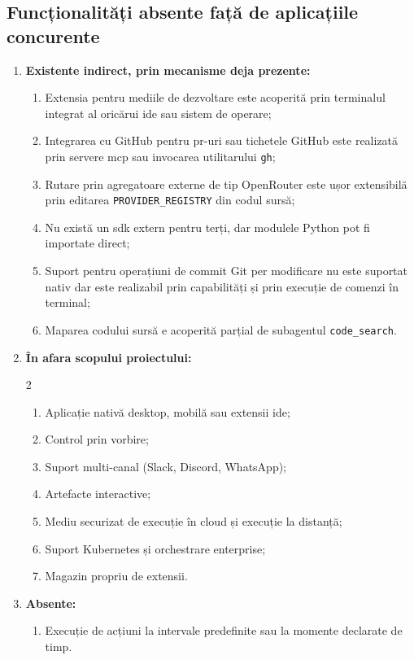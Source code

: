 \documentclass[12pt, a4paper, oneside, romanian]{teza-upb}
\begin{document}
    \subsection{Funcționalități absente față de aplicațiile concurente}

    \begin{enumerate}

      \item \textbf{Existente indirect, prin mecanisme deja prezente:}

      \begin{enumerate}
        \item Extensia pentru mediile de dezvoltare este acoperită prin terminalul integrat al oricărui \ac{ide} sau sistem de operare;
        \item Integrarea cu GitHub pentru \ac{pr}-uri sau tichetele GitHub este realizată prin servere \ac{mcp} sau invocarea utilitarului \texttt{gh};
        \item Rutare prin agregatoare externe de tip OpenRouter este ușor extensibilă prin editarea \texttt{PROVIDER\_REGISTRY} din codul sursă;
        \item Nu există un \ac{sdk} extern pentru terți, dar modulele Python pot fi importate direct;
        \item Suport pentru operațiuni de commit Git per modificare nu este suportat nativ dar este realizabil prin capabilități și prin execuție de comenzi în terminal;
        \item Maparea codului sursă e acoperită parțial de subagentul \texttt{code\_search}.
      \end{enumerate}

      \item \textbf{În afara scopului proiectului:}

      \begin{multicols}{2}
        \begin{enumerate}
          \item Aplicație nativă desktop, mobilă sau extensii \ac{ide};
          \item Control prin vorbire;
          \item Suport multi-canal (Slack, Discord, WhatsApp);
          \item Artefacte interactive;
          \item Mediu securizat de execuție în cloud și execuție la distanță;
          \item Suport Kubernetes și orchestrare enterprise;
          \item Magazin propriu de extensii.
        \end{enumerate}
      \end{multicols}

    \item \textbf{Absente:}

        \begin{enumerate}
          \item Execuție de acțiuni la intervale predefinite sau la momente declarate de timp.
        \end{enumerate}

  \end{enumerate}
\end{document}
